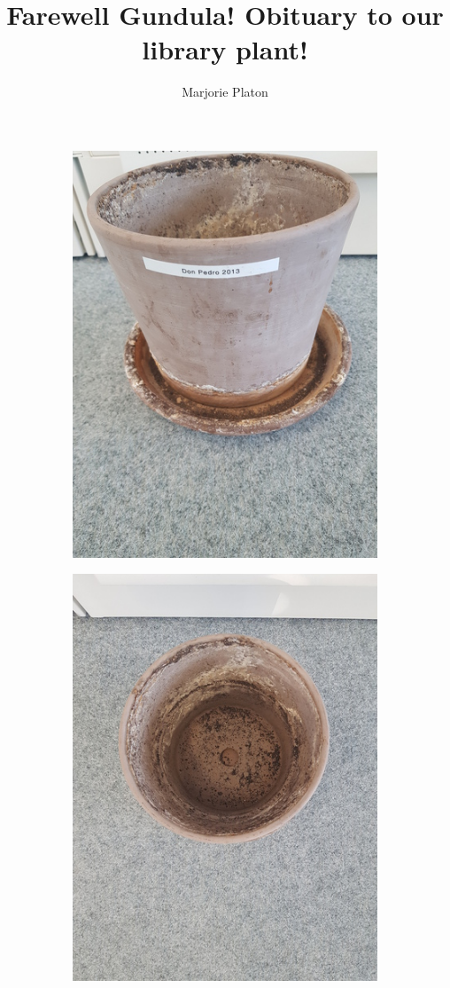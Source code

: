 \documentclass[a4paper,
fontsize=11pt,
oneside,
numbers=noperiodatend,
parskip=half-,
bibliography=totoc,
final
]{scrartcl}
\title{\LARGE{Farewell Gundula! Obituary to our library plant!}}%
\author{Marjorie Platon} %
\date{}
\begin{document}
\maketitle
\thispagestyle{fancyplain} 



\begin{figure}[h!]
\centering
\begin{subfigure}{.5\textwidth}
  \centering
  \includegraphics[angle=270,width=.7\linewidth]{img/20200731-080331.jpg}
\end{subfigure}%
\begin{subfigure}{.5\textwidth}
  \centering
  \includegraphics[angle=270,width=.7\linewidth]{img/20200731-080339.jpg}
\end{subfigure}
\end{figure}
\end{document}
